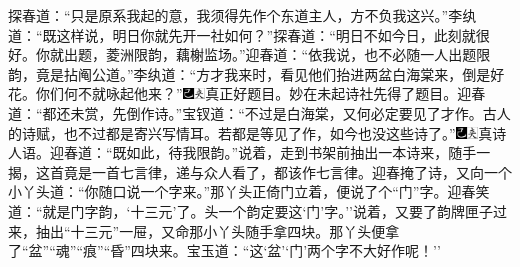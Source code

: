 探春道：``只是原系我起的意，我须得先作个东道主人，方不负我这兴。''李纨道：``既这样说，明日你就先开一社如何？''探春道：``明日不如今日，此刻就很好。你就出题，菱洲限韵，藕榭监场。''迎春道：``依我说，也不必随一人出题限韵，竟是拈阄公道。''李纨道：``方才我来时，看见他们抬进两盆白海棠来，倒是好花。你们何不就咏起他来？''{\includegraphics[width=3mm]{../Images/00003}\includegraphics[width=3mm]{../Images/00012}\footnotesize \kaishu 真正好题目。妙在未起诗社先得了题目。}迎春道：``都还未赏，先倒作诗。''宝钗道：``不过是白海棠，又何必定要见了才作。古人的诗赋，也不过都是寄兴写情耳。若都是等见了作，如今也没这些诗了。''{\includegraphics[width=3mm]{../Images/00003}\includegraphics[width=3mm]{../Images/00012}\footnotesize \kaishu 真诗人语。}迎春道：``既如此，待我限韵。''说着，走到书架前抽出一本诗来，随手一揭，这首竟是一首七言律，递与众人看了，都该作七言律。迎春掩了诗，又向一个小丫头道：``你随口说一个字来。''那丫头正倚门立着，便说了个``门''字。迎春笑道：``就是门字韵，`十三元'了。头一个韵定要这`门'字。''说着，又要了韵牌匣子过来，抽出``十三元''一屉，又命那小丫头随手拿四块。那丫头便拿了``盆''``魂''``痕''``昏''四块来。宝玉道：``这`盆'`门'两个字不大好作呢！''

